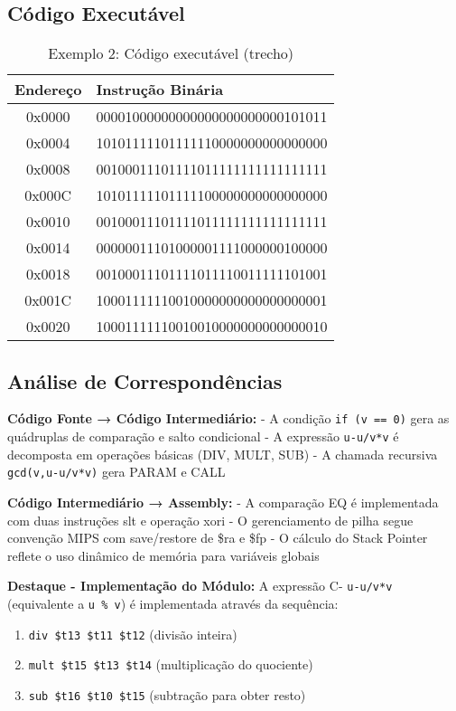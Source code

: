 \documentclass[
	12pt,				%
	oneside,
	a4paper,			%
	english,			%
	french,				%
	spanish,			%
	brazil,				%
	]{abntex2}
\begin{document}
\subsection{Código Executável}

\begin{table}[H]
\centering
\caption{Exemplo 2: Código executável (trecho)}
\begin{tabular}{|c|l|}
\hline
\textbf{Endereço} & \textbf{Instrução Binária} \\
\hline
0x0000 & 00001000000000000000000000101011 \\
\hline
0x0004 & 10101111101111110000000000000000 \\
\hline
0x0008 & 00100011101111011111111111111111 \\
\hline
0x000C & 10101111101111100000000000000000 \\
\hline
0x0010 & 00100011101111011111111111111111 \\
\hline
0x0014 & 00000011101000001111000000100000 \\
\hline
0x0018 & 00100011101111011110011111101001 \\
\hline
0x001C & 10001111110010000000000000000001 \\
\hline
0x0020 & 10001111110010010000000000000010 \\
\hline
\end{tabular}
\end{table}

\subsection{Análise de Correspondências}

\textbf{Código Fonte → Código Intermediário:}
- A condição \texttt{if (v == 0)} gera as quádruplas de comparação e salto condicional
- A expressão \texttt{u-u/v*v} é decomposta em operações básicas (DIV, MULT, SUB)  
- A chamada recursiva \texttt{gcd(v,u-u/v*v)} gera PARAM e CALL

\textbf{Código Intermediário → Assembly:}
- A comparação EQ é implementada com duas instruções slt e operação xori
- O gerenciamento de pilha segue convenção MIPS com save/restore de \$ra e \$fp
- O cálculo do Stack Pointer reflete o uso dinâmico de memória para variáveis globais

\textbf{Destaque - Implementação do Módulo:}
A expressão C- \texttt{u-u/v*v} (equivalente a \texttt{u \% v}) é implementada através da sequência:
\begin{enumerate}
    \item \texttt{div \$t13 \$t11 \$t12} (divisão inteira)
    \item \texttt{mult \$t15 \$t13 \$t14} (multiplicação do quociente)
    \item \texttt{sub \$t16 \$t10 \$t15} (subtração para obter resto)
\end{enumerate}
\end{document}
